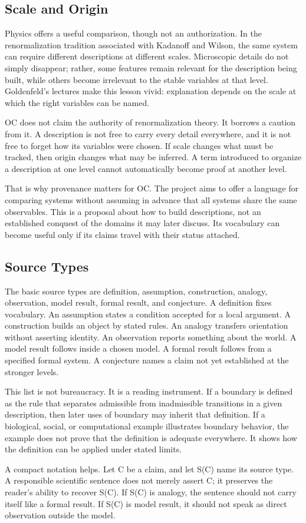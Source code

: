 \documentclass[11pt,a4paper,openany]{book}
\begin{document}
\subsection{Scale and Origin}
Physics offers a useful comparison, though not an authorization. In the renormalization tradition associated with Kadanoff and Wilson, the same system can require different descriptions at different scales. Microscopic details do not simply disappear; rather, some features remain relevant for the description being built, while others become irrelevant to the stable variables at that level. Goldenfeld's lectures make this lesson vivid: explanation depends on the scale at which the right variables can be named. \cite{goldenfeld_lectures,kadanoff_scaling}\par
OC does not claim the authority of renormalization theory. It borrows a caution from it. A description is not free to carry every detail everywhere, and it is not free to forget how its variables were chosen. If scale changes what must be tracked, then origin changes what may be inferred. A term introduced to organize a description at one level cannot automatically become proof at another level.\par
That is why provenance matters for OC. The project aims to offer a language for comparing systems without assuming in advance that all systems share the same observables. This is a proposal about how to build descriptions, not an established conquest of the domains it may later discuss. Its vocabulary can become useful only if its claims travel with their status attached.\par
\subsection{Source Types}
The basic source types are definition, assumption, construction, analogy, observation, model result, formal result, and conjecture. A definition fixes vocabulary. An assumption states a condition accepted for a local argument. A construction builds an object by stated rules. An analogy transfers orientation without asserting identity. An observation reports something about the world. A model result follows inside a chosen model. A formal result follows from a specified formal system. A conjecture names a claim not yet established at the stronger levels. \cite{goldenfeld_lectures,kadanoff_scaling}\par
This list is not bureaucracy. It is a reading instrument. If a boundary is defined as the rule that separates admissible from inadmissible transitions in a given description, then later uses of boundary may inherit that definition. If a biological, social, or computational example illustrates boundary behavior, the example does not prove that the definition is adequate everywhere. It shows how the definition can be applied under stated limits.\par
A compact notation helps. Let C be a claim, and let S(C) name its source type. A responsible scientific sentence does not merely assert C; it preserves the reader's ability to recover S(C). If S(C) is analogy, the sentence should not carry itself like a formal result. If S(C) is model result, it should not speak as direct observation outside the model.\par
\end{document}
